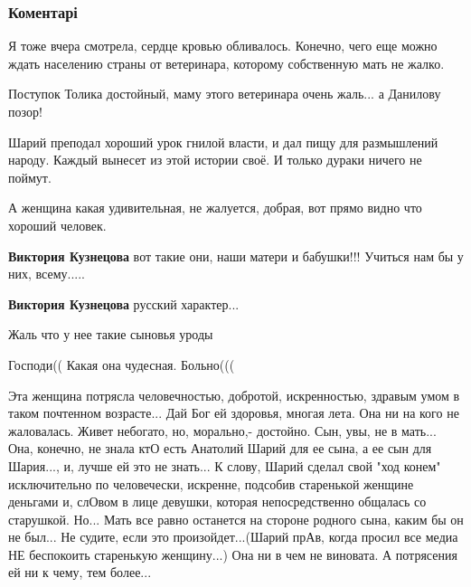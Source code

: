  
 
 
 
 
\subsubsection{Коментарі}

\begin{itemize} %

Я тоже вчера смотрела, сердце кровью обливалось. Конечно, чего еще можно ждать
населению страны от ветеринара, которому собственную мать не жалко.


Поступок Толика достойный, маму этого ветеринара очень жаль... а Данилову позор!

Шарий преподал хороший урок гнилой власти, и дал пищу для размышлений народу.
Каждый вынесет из этой истории своё. И только дураки ничего не поймут.

А женщина какая удивительная, не жалуется, добрая, вот прямо видно что хороший человек.

\begin{itemize} %
\textbf{Виктория Кузнецова} вот такие они, наши матери и бабушки!!! Учиться нам бы у них, всему.....

\textbf{Виктория Кузнецова} русский характер...

Жаль что у нее такие сыновья уроды
\end{itemize} %

Господи(( Какая она чудесная. Больно(((


Эта женщина потрясла человечностью, добротой, искренностью, здравым умом в
таком почтенном возрасте... Дай Бог ей здоровья, многая лета. Она ни на кого не
жаловалась. Живет небогато, но, морально,- достойно. Сын, увы, не в мать...
Она, конечно, не знала ктО есть Анатолий Шарий для ее сына, а ее сын для
Шария..., и, лучше ей это не знать... К слову, Шарий сделал свой "ход конем"
исключительно по человечески, искренне, подсобив старенькой женщине деньгами и,
слОвом в лице девушки, которая непосредственно общалась со старушкой. Но... Мать
все равно останется на стороне родного сына, каким бы он не был... Не судите,
если это произойдет...(Шарий прАв, когда просил все медиа НЕ беспокоить
старенькую женщину...) Она ни в чем не виновата. А потрясения ей ни к чему, тем
более...



\end{itemize}
